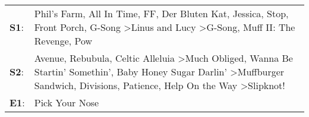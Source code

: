 \begin{supertabular}{p{0.03\textwidth}p{0.92\textwidth}}
 \textbf{S1}:  &                            Phil's Farm\textsuperscript{}, \enspace All In Time\textsuperscript{}, \enspace FF\textsuperscript{}, \enspace Der Bluten Kat\textsuperscript{}, \enspace Jessica\textsuperscript{}, \enspace Stop\textsuperscript{}, \enspace Front Porch\textsuperscript{}, \enspace G-Song\textsuperscript{} \textgreater \enspace Linus and Lucy\textsuperscript{} \textgreater \enspace G-Song\textsuperscript{}, \enspace Muff II: The Revenge\textsuperscript{}, \enspace Pow\textsuperscript{}  \enspace  \\
 \textbf{S2}:  &  Avenue\textsuperscript{}, \enspace Rebubula\textsuperscript{}, \enspace Celtic Alleluia\textsuperscript{} \textgreater \enspace Much Obliged\textsuperscript{}, \enspace Wanna Be Startin' Somethin'\textsuperscript{}, \enspace Baby Honey Sugar Darlin'\textsuperscript{} \textgreater \enspace Muffburger Sandwich\textsuperscript{}, \enspace Divisions\textsuperscript{}, \enspace Patience\textsuperscript{}, \enspace Help On the Way\textsuperscript{} \textgreater \enspace Slipknot!\textsuperscript{}  \enspace  \\
 \textbf{E1}:  &                                                                                                                                                                                                                                                                                                                                                                                                                                                                                  Pick Your Nose\textsuperscript{}  \enspace  \\
\end{supertabular}

